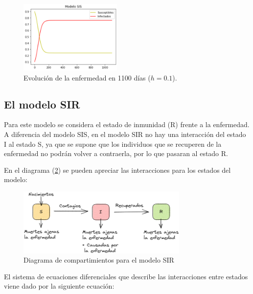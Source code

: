 \begin{figure}[h]
  \centering
    \includegraphics[width=0.45\textwidth]{Imagenes/ex1SIS.PNG}
  \caption{Evolución de la enfermedad en 1100 días ($h=0.1$).}
  \label{fig:Ejemplo 2 - SIS}
\end{figure}

\newpage

\subsection{El modelo SIR}\label{sub:modeloSIR}

Para este modelo se considera el estado de inmunidad (R) frente a la enfermedad. A diferencia del modelo SIS, en el modelo SIR no hay una interacción del estado I al estado S, ya que se supone que los individuos que se recuperen de la enfermedad no podrán volver a contraerla, por lo que pasaran al estado R. 

En el diagrama (\ref{fig:SIR}) se pueden apreciar las interacciones para los estados del modelo:

\begin{figure}[h]
  \centering
    \includegraphics[width=0.75\textwidth]{Imagenes/SIR_compartimientos.PNG}
  \caption{Diagrama de compartimientos para el modelo SIR}
  \label{fig:SIR}
\end{figure}

El sistema de ecuaciones diferenciales que describe las interacciones entre estados viene dado por la siguiente ecuación:

